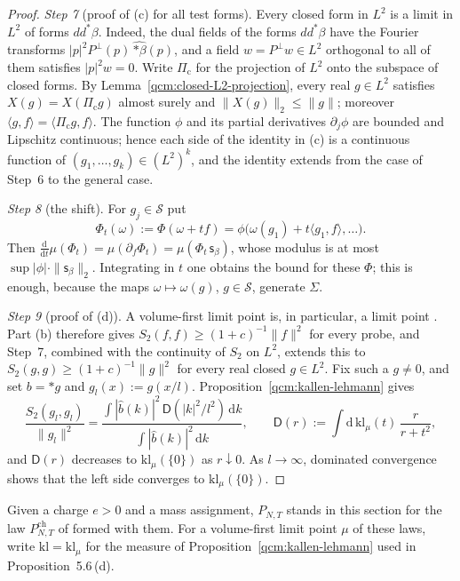 \documentclass[11pt,letterpaper,reqno]{amsart}
\theoremstyle{definition}
\begin{document}
\begin{proof}
\emph{Step 7} (proof of (c) for all test forms).
Every closed form in $L^2$ is a limit in $L^2$ of forms $dd^*\beta$.
Indeed, the dual fields of the forms $dd^*\beta$ have the Fourier transforms $|p|^2P^\perp(p)\,\widehat{\ast\beta}(p)$, and a field $w=P^\perp w\in L^2$ orthogonal to all of them satisfies $|p|^2w=0$.
Write $\Pi_{\mathrm c}$ for the projection of $L^2$ onto the subspace of closed forms.
By Lemma~\ref{qcm:closed-L2-projection}, every real $g\in L^2$ satisfies $X(g)=X(\Pi_{\mathrm c}g)$ almost surely and $\|X(g)\|_2\le\|g\|$; moreover $\langle g,f\rangle=\langle\Pi_{\mathrm c}g,f\rangle$.
The function $\phi$ and its partial derivatives $\partial_j\phi$ are bounded and Lipschitz continuous; hence each side of the identity in (c) is a continuous function of $(g_1,\dots,g_k)\in(L^2)^k$, and the identity extends from the case of Step~6 to the general case.

\emph{Step 8} (the shift).
For $g_j\in\mathcal S$ put
\begin{equation*}
\Phi_t(\omega):=\Phi(\omega+tf)=\phi\bigl(\omega(g_1)+t\langle g_1,f\rangle,\dots\bigr).
\end{equation*}
Then $\frac{\mathrm d}{\mathrm dt}\mu(\Phi_t)=\allowbreak \mu(\partial_f\Phi_t)=\allowbreak \mu(\Phi_t\,\allowbreak \mathsf s_\beta)$, whose modulus is at most $\sup|\phi|\cdot\|\mathsf s_\beta\|_2$.
Integrating in $t$ one obtains the bound for these $\Phi$; this is enough, because the maps $\omega\mapsto\omega(g)$, $g\in\mathcal S$, generate $\Sigma$.

\emph{Step 9} (proof of (d)).
A volume-first limit point is, in particular, a limit point \cite[Section~6.2]{QEDConstruction}.
Part (b) therefore gives $S_2(f,f)\ge(1+c)^{-1}\|f\|^2$ for every probe, and Step~7, combined with the continuity of $S_2$ on $L^2$, extends this to $S_2(g,g)\ge(1+c)^{-1}\|g\|^2$ for every real closed $g\in L^2$.
Fix such a $g\ne0$, and set $b=\ast g$ and $g_l(x):=g(x/l)$.
Proposition~\ref{qcm:kallen-lehmann} gives
\begin{equation*}
\frac{S_2(g_l,g_l)}{\|g_l\|^2}=\frac{\int|\hat b(k)|^2\,\mathsf D(|k|^2/l^2)\,\mathrm dk}{\int|\hat b(k)|^2\,\mathrm dk},\qquad\mathsf D(r):=\int\mathrm d\,\mathrm{kl}_\mu(t)\,\frac{r}{r+t^2},
\end{equation*}
and $\mathsf D(r)$ decreases to $\mathrm{kl}_\mu(\{0\})$ as $r\downarrow0$.
As $l\to\infty$, dominated convergence shows that the left side converges to $\mathrm{kl}_\mu(\{0\})$.
\end{proof}
Given a charge $e>0$ and a mass assignment, $P_{N,T}$ stands in this section for the law $P^{\mathrm{ch}}_{N,T}$ of \cite[Section~6.1]{QEDConstruction} formed with them. For a volume-first limit point $\mu$ of these laws, write $\mathrm{kl}=\mathrm{kl}_\mu$ for the measure of Proposition~\ref{qcm:kallen-lehmann} used in Proposition~5.6\,(d).
\end{document}
